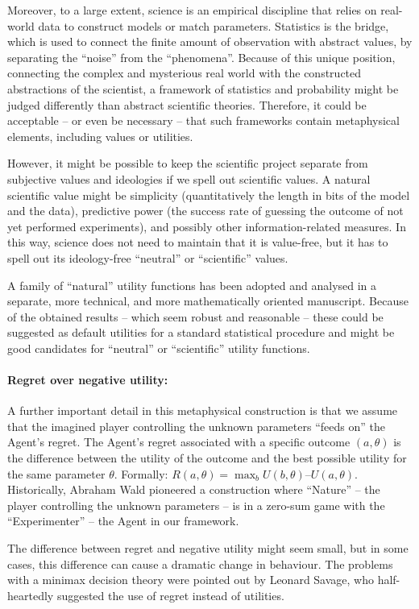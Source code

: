 \documentclass{article}
\begin{document}
Moreover, to a large extent, science is an empirical discipline that relies on real-world data to construct models or match parameters. Statistics is the bridge, which is used to connect the finite amount of observation with abstract values, by separating the ``noise'' from the ``phenomena''. Because of this unique position, connecting the complex and mysterious real world with the constructed abstractions of the scientist, a framework of statistics and probability might be judged differently than abstract scientific theories. Therefore, it could be acceptable – or even be necessary – that such frameworks contain metaphysical elements, including values or utilities. 

However, it might be possible to keep the scientific project separate from subjective values and ideologies if we spell out scientific values. A natural scientific value might be simplicity (quantitatively the length in bits of the model and the data), predictive power (the success rate of guessing the outcome of not yet performed experiments), and possibly other information-related measures. In this way, science does not need to maintain that it is value-free, but it has to spell out its ideology-free ``neutral'' or ``scientific'' values.

A family of ``natural'' utility functions has been adopted and analysed in a separate, more technical, and more mathematically oriented manuscript. Because of the obtained results – which seem robust and reasonable – these could be suggested as default utilities for a standard statistical procedure and might be good candidates for ``neutral'' or ``scientific'' utility functions.

\paragraph{Regret over negative utility:}
A further important detail in this metaphysical construction is that we assume that the imagined player controlling the unknown parameters ``feeds on'' the Agent’s regret.
The Agent’s regret associated with a specific outcome $(a,\theta)$ is the difference between the utility of the outcome and the best possible utility for the same parameter $\theta$. Formally: $R(a,\theta) = \max_{b} U(b,\theta) – U(a,\theta)$.
Historically, Abraham Wald pioneered a construction where ``Nature'' – the player controlling the unknown parameters – is in a zero-sum game with the ``Experimenter'' – the Agent in our framework.

The difference between regret and negative utility might seem small, but in some cases, this difference can cause a dramatic change in behaviour.
The problems with a minimax decision theory were pointed out by Leonard Savage, who half-heartedly suggested the use of regret instead of utilities.
\end{document}
